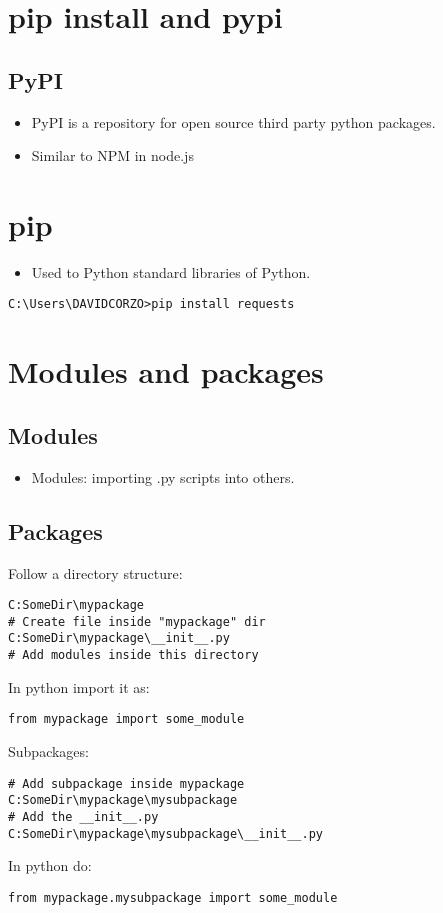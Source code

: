 \section{pip install and pypi}
\subsection{PyPI}
\begin{itemize}
    \item PyPI is a repository for open source third party python packages.
    \item Similar to NPM in node.js 
\end{itemize}

\section{pip}
\begin{itemize}
    \item Used to Python standard libraries of Python. 
\end{itemize}
\begin{Verbatim}[breaklines=true, breakanywhere=true]
C:\Users\DAVIDCORZO>pip install requests
\end{Verbatim}

\section{Modules and packages}
\subsection{Modules}
\begin{itemize}
    \item Modules: importing .py scripts into others. 
\end{itemize}

\subsection{Packages}
Follow a directory structure: 
\begin{Verbatim}[breaklines=true, breakanywhere=true]
C:SomeDir\mypackage
# Create file inside "mypackage" dir 
C:SomeDir\mypackage\__init__.py 
# Add modules inside this directory
\end{Verbatim}
In python import it as: 
\begin{Verbatim}[breaklines=true, breakanywhere=true]
from mypackage import some_module
\end{Verbatim}
Subpackages: 
\begin{Verbatim}[breaklines=true, breakanywhere=true]
# Add subpackage inside mypackage 
C:SomeDir\mypackage\mysubpackage
# Add the __init__.py
C:SomeDir\mypackage\mysubpackage\__init__.py 
\end{Verbatim}
In python do: 
\begin{Verbatim}[breaklines=true, breakanywhere=true]
from mypackage.mysubpackage import some_module
\end{Verbatim}

